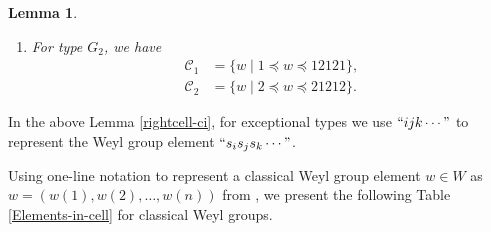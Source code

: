 \documentclass[11pt, reqno]{amsart}
\newcommand{\aff}{\mathbf{a}}
\renewcommand{\subset}{\subseteq}
\newtheorem{lem}[Thm]{Lemma}
\theoremstyle{definition}
\numberwithin{equation}{section}
\begin{document}
\begin{lem}
\begin{enumerate}
\item For type $G_{2}$, we have 
\begin{align*}
\mathcal{C}_1&=\{ w\mid 1\preceq w\preceq 12121  \},\\
\mathcal{C}_2&=\{ w\mid 2\preceq w\preceq 21212 \}.
\end{align*}
    
\end{enumerate}

\end{lem}

In the above Lemma \ref{rightcell-ci}, for exceptional types we use $``ijk\cdots"$ to represent the Weyl group element $``s_is_js_k\cdots"$.

Using one-line notation to represent a classical Weyl group element $w \in W$ as $w = (w(1), w(2), \dots, w(n))$ from \cite[\S 3]{BXX}, we present the following Table \ref{Elements-in-cell} for classical Weyl groups.
\end{document}
